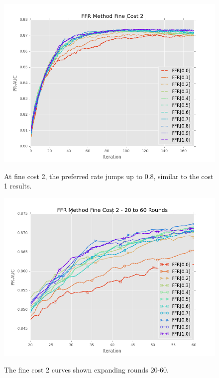 \documentclass[ms]{nuthesis}
\begin{document}
\FloatBarrier
\begin{figure}[!htb]
	\centering
    \includegraphics[width=1.0\columnwidth]{fig/FFR_PR_Cost2_rnds0_171}
    \label{fig:FFR_PR_Cost2_rnds0_171}
    \caption{At fine cost 2, the preferred rate jumps up to 0.8,
    similar to the cost 1 results.}
\end{figure}
\FloatBarrier

\FloatBarrier
\begin{figure}[!htb]
	\centering
    \includegraphics[width=1.0\columnwidth]{fig/FFR_PR_Cost2_rnds20_60}
    \label{fig:FFR_PR_Cost2_rnds20_60}
    \caption{The fine cost 2 curves shown expanding rounds 20-60.}
\end{figure}
\FloatBarrier
\end{document}
